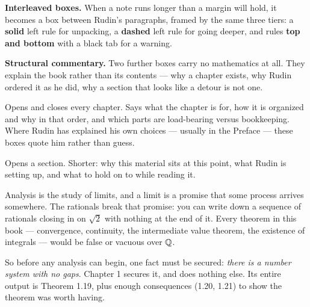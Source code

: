 \documentclass[11pt,twoside]{article}
\begin{document}
\medskip
\noindent
\textbf{Interleaved boxes.} When a note runs longer than a margin will hold, it
becomes a box between Rudin's paragraphs, framed by the same three tiers: a
\textbf{solid} left rule for unpacking, a \textbf{dashed} left rule for going
deeper, and rules \textbf{top and bottom} with a black tab for a warning.

\medskip
\noindent
\textbf{Structural commentary.} Two further boxes carry no mathematics at all.
They explain the book rather than its contents --- why a chapter exists, why
Rudin ordered it as he did, why a section that looks like a detour is not one.

\begin{roadmap}
Opens and closes every chapter. Says what the chapter is for, how it is
organized and why in that order, and which parts are load-bearing versus
bookkeeping. Where Rudin has explained his own choices --- usually in the
Preface --- these boxes quote him rather than guess.
\end{roadmap}

\begin{signpost}
Opens a section. Shorter: why this material sits at this point, what Rudin is
setting up, and what to hold on to while reading it.
\end{signpost}

\newpage

\begin{roadmap}
Analysis is the study of limits, and a limit is a promise that some process
arrives somewhere. The rationals break that promise: you can write down a
sequence of rationals closing in on $\sqrt2$ with nothing at the end of it.
Every theorem in this book --- convergence, continuity, the intermediate value
theorem, the existence of integrals --- would be false or vacuous over $\mathbb{Q}$.

\medskip
So before any analysis can begin, one fact must be secured: \emph{there is a
number system with no gaps}. Chapter 1 secures it, and does nothing else. Its
entire output is Theorem 1.19, plus enough consequences (1.20, 1.21) to show the
theorem was worth having.
\end{roadmap}
\end{document}
